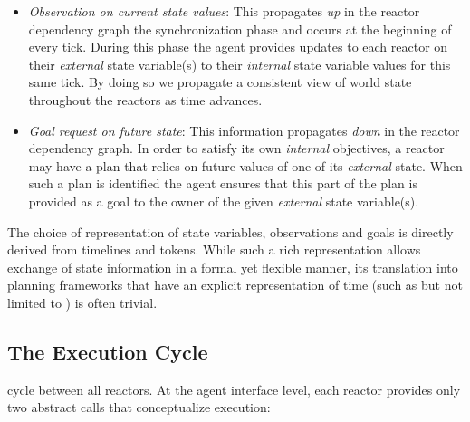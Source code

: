 \begin{itemize}

\item {\em Observation on current state values}: This propagates
  \emph{up} in the reactor dependency graph  the
  synchronization phase and occurs at the beginning of every
  tick. During this phase the agent provides updates to each reactor
  on their {\em external} state variable(s) to  their {\em internal} state variable values for
  this same tick. By doing so we propagate a consistent view of world
  state throughout the reactors as time advances. 

\item {\em Goal request on future state}: This information propagates
  \emph{down} in the reactor dependency graph. In order to satisfy its
  own {\em internal} objectives, a reactor may have a plan that relies
  on future values of one  of its {\em external}
  state. When such a plan is identified the agent ensures that this
  part of the plan is provided as a goal to the owner of the given
  {\em external} state variable(s).

\end{itemize}

The choice of representation of state variables, observations and
goals is directly derived from \eu timelines and tokens.  While such a
rich representation allows exchange of state information in a formal
yet flexible manner, its translation into planning frameworks that
have an explicit representation of time (such as but not limited to
\eue) is often trivial.

\subsection{The Execution Cycle}
\label{sec:arch:exec}

 cycle
between all reactors. At the agent interface level, each reactor
provides only two abstract calls that conceptualize execution:

